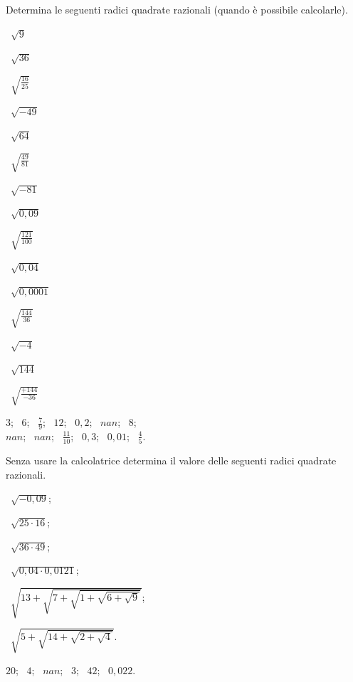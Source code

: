 \begin{esercizio}
\label{ese:2.01}
Determina le seguenti radici quadrate razionali 
(quando è possibile calcolarle).
\vspace{-.7em}
\begin{htmulticols}{5}
\begin{enumeratea}
\item~\(\sqrt 9\)
\item~\(\sqrt{36}\)
\item~\(\sqrt{\frac{16}{25}}\)
\item~\(\sqrt{-49}\)
\item~\(\sqrt{64}\)
\item~\(\sqrt{\frac{49}{81}}\)
\item~\(\sqrt{-81}\)
\item~\(\sqrt{0,09}\)
\item~\(\sqrt{\frac{121}{100}}\)
\item~\(\sqrt{0,04}\)
\item~\(\sqrt{0,0001}\)
\item~\(\sqrt{\frac{144}{36}}\)
\item~\(\sqrt{-4}\)
\item~\(\sqrt{144}\)
\item~\(\sqrt{\frac{+144}{-36}}\)
\end{enumeratea}
\end{htmulticols}
\vspace*{-8pt}
\noindent\! \(3\);~ 
 \(6\);~ 
 \(\frac{7}{9}\);~ 
 \(12\);~ 
 \(0,2\);~ 
 \(nan\);~ 
 \(8\);~  \\
 \(nan\);~ 
 \(nan\);~ 
 \(\frac{11}{10}\);~
 \(0,3\);~ 
 \(0,01\);~ 
 \(\frac{4}{5}\). 
\end{esercizio}


\begin{esercizio}
\label{ese:2.02}
Senza usare la calcolatrice determina il valore delle seguenti radici 
quadrate razionali.
\vspace{-.7em}
\begin{htmulticols}{2}
\begin{enumeratea}
\item~\(\sqrt{-0,09}\);
\item~\(\sqrt{25\cdot 16}\);
\item~\(\sqrt{36\cdot 49}\);
\item~\(\sqrt{0,04\cdot 0,0121}\);
\item~\(\sqrt{13+\sqrt{7+\sqrt{1+\sqrt{6+\sqrt 9}}}}\);
\item~\(\sqrt{5+\sqrt{14+\sqrt{2+\sqrt 4}}}\).
\end{enumeratea}
\end{htmulticols}
\vspace*{-8pt}
\noindent\! \(20\);~ 
 \(4\);~ 
 \(nan\);~ 
 \(3\);~ 
 \(42\);~ 
 \(0,022\).
\end{esercizio}

